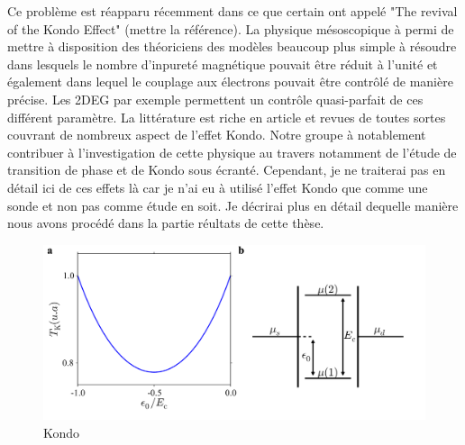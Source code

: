 Ce problème est réapparu récemment dans ce que certain ont appelé "The revival of the Kondo Effect" (mettre la référence). La physique mésoscopique à permi de mettre à disposition des théoriciens des modèles beaucoup plus simple à résoudre dans lesquels le nombre d'inpureté magnétique pouvait être réduit à l'unité et également dans lequel le couplage aux électrons pouvait être contrôlé de manière précise. Les 2DEG par exemple permettent un contrôle quasi-parfait de ces différent paramètre. La littérature est riche en article et revues de toutes sortes couvrant de nombreux aspect de l'effet Kondo. Notre groupe à notablement contribuer à l'investigation de cette physique au travers notamment de l'étude de transition de phase et de Kondo sous écranté. Cependant, je ne traiterai pas en détail ici de ces effets là car je n'ai eu à utilisé l'effet Kondo que comme une sonde et non pas comme étude en soit. Je décrirai plus en détail dequelle manière nous avons procédé dans la partie réultats de cette thèse.

\begin{figure}
\includegraphics[scale=0.5]{Theorie/Transport/figure6/figure6.pdf} 
\caption{Kondo}
\label{Kondo_param}
\end{figure}



